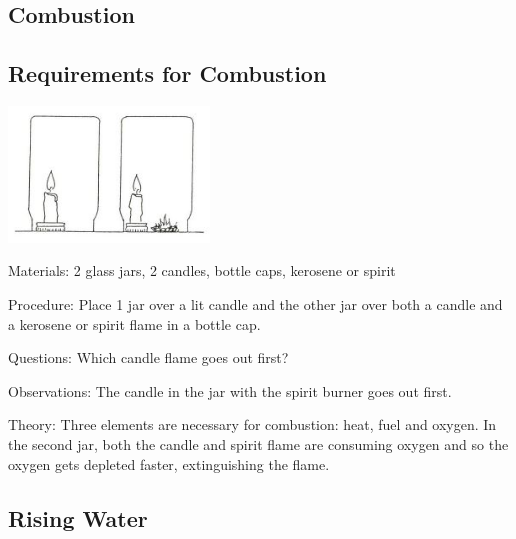 \begin{multicols}{2}

\section*{Combustion}


\subsection{Requirements for Combustion}

\begin{center}
\includegraphics[width=0.4\textwidth]{./img/source/flame-extinguisher.jpg}
\end{center}

\begin{description*}
\item[Materials:]{2 glass jars, 2 candles, bottle caps, kerosene or spirit}
\item[Procedure:]{Place 1 jar over a lit candle and the other jar over both a candle and a kerosene or spirit flame in a bottle cap.}
\item[Questions:]{Which candle flame goes out first?}
\item[Observations:]{The candle in the jar with the spirit burner goes out first.}
\item[Theory:]{Three elements are necessary for combustion: heat, fuel and oxygen. In the second jar, both the candle and spirit flame are consuming oxygen and so the oxygen gets depleted faster, extinguishing the flame.}
\end{description*}

\subsection{Rising Water}


\end{multicols}
